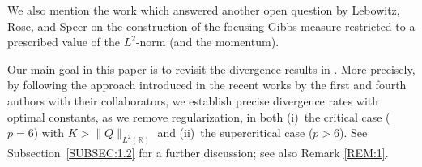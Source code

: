 \documentclass[letterpaper, 11pt,  reqno]{amsart}
\newcommand{\noi}{\noindent}
\newcommand{\R}{\mathbb{R}}
\numberwithin{equation}{section}
\numberwithin{theorem}{section}
\begin{document}
\noi
We also mention the work \cite{OQ}
which answered another open question by 
Lebowitz, Rose, and Speer
\cite{LRS}
on the construction of the focusing Gibbs measure
restricted to a prescribed value of the $L^2$-norm
(and the momentum).

Our main goal in this paper is to revisit the divergence results
in \cite{LRS, OST1}.
More precisely, 
by following the approach introduced in the recent works \cite{OST, GOTT}
by the first and fourth authors with their collaborators, 
we 
establish  precise  divergence rates
with optimal constants,  as we remove regularization,
in both (i)~the critical case ($p= 6$)
with 
$K>\|Q\|_{L^2(\R)}$
 and (ii)~the supercritical case ($p > 6$).
See Subsection~\ref{SUBSEC:1.2}
for a further discussion; see also Remark \ref{REM:1}.
\end{document}
